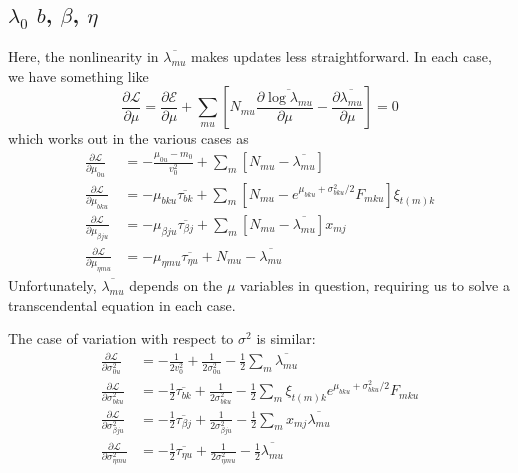 \documentclass[11pt]{article}
\begin{document}
\subsection{$\lambda_0$ $b$, $\beta$, $\eta$}
Here, the nonlinearity in $\overline{\lambda_{mu}}$ makes updates less straightforward. In each case, we have something like
\begin{equation}
    \frac{\partial\mathcal{L}}{\partial \mu} = \frac{\partial\mathcal{E}}{\partial \mu} + \sum_{mu} \left[N_{mu} \frac{\partial\overline{\log \lambda_{mu}}}{\partial \mu} - \frac{\partial\overline{\lambda_{mu}}}{\partial \mu}\right] = 0
\end{equation}
which works out in the various cases as
\begin{align}
    \frac{\partial\mathcal{L}}{\partial \mu_{0u}} &= -\frac{\mu_{0u} - m_0}{v_0^2} + \sum_m [N_{mu} - \overline{\lambda_{mu}}] \\
    \frac{\partial\mathcal{L}}{\partial \mu_{bku}} &= 
    - \mu_{bku} \overline{\tau_{bk}} + \sum_m [N_{mu} - e^{\mu_{bku} + \sigma^2_{bku} / 2} F_{mku} ] \xi_{t(m) k} \\
    \frac{\partial\mathcal{L}}{\partial \mu_{\beta ju}} &= 
    - \mu_{\beta ju} \overline{\tau_{\beta j}} + \sum_m [N_{mu} - \overline{\lambda_{mu}}] x_{mj}  \\
    \frac{\partial\mathcal{L}}{\partial \mu_{\eta mu}} &= 
    - \mu_{\eta mu} \overline{\tau_{\eta u}} + N_{mu} - 
    \overline{\lambda_{mu}}
\end{align}
Unfortunately, $\overline{\lambda_{mu}}$ depends on the $\mu$ variables in question, requiring us to solve a transcendental equation in each case.

The case of variation with respect to $\sigma^2$ is similar:
\begin{align}
    \frac{\partial\mathcal{L}}{\partial \sigma^2_{0u}} &= -\frac{1}{2v_0^2} + \frac{1}{2\sigma^2_{0u}} - \frac{1}{2} \sum_m \overline{\lambda_{mu}} \\
    \frac{\partial\mathcal{L}}{\partial \sigma^2_{bku}} &= 
    - \frac{1}{2} \overline{\tau_{bk}} + \frac{1}{2\sigma^2_{bku}} - \frac{1}{2}\sum_m \xi_{t(m)k} e^{\mu_{bku} + \sigma^2_{bku} / 2} F_{mku}  \\
    \frac{\partial\mathcal{L}}{\partial \sigma^2_{\beta ju}} &= 
    - \frac{1}{2} \overline{\tau_{\beta j}} + \frac{1}{2\sigma^2_{\beta ju}} - \frac{1}{2} \sum_m x_{mj} \overline{\lambda_{mu}} \\
    \frac{\partial\mathcal{L}}{\partial \sigma^2_{\eta mu}} &= 
    -\frac{1}{2} \overline{\tau_{\eta u}} + \frac{1}{2\sigma^2_{\eta mu}} - \frac{1}{2} \overline{\lambda_{mu}}
\end{align}
\end{document}
